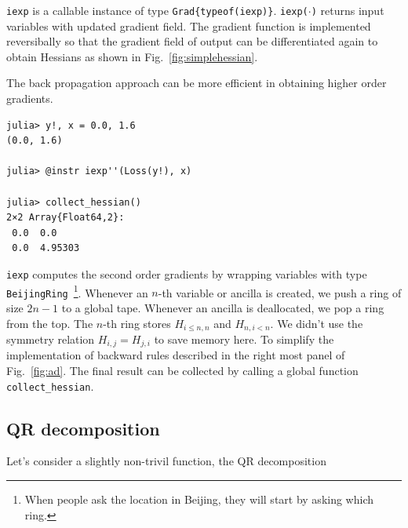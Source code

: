 \documentclass[aps,twocolumn,longbibliography,english,superscriptaddress,prr]{revtex4-1}
\newcommand{\<}{\langle}
\renewcommand{\>}{\rangle}
\newcommand{\Fig}[1]{Fig.~\ref{#1}}
\theoremstyle{definition}\newtheorem{definition}{\textit{Definition}}
\begin{document}
\texttt{iexp\textquotesingle} is a callable instance of type \texttt{Grad\{typeof(iexp)\}}. \texttt{iexp\textquotesingle($\cdot$)} returns input variables with updated gradient field.
The gradient function is implemented reversibally so that the gradient field of output can be differentiated again to obtain Hessians as shown in \Fig{fig:simplehessian}.

The back propagation approach can be more efficient in obtaining higher order gradients.

\begin{minipage}{.44\textwidth}
\begin{lstlisting}
julia> y!, x = 0.0, 1.6
(0.0, 1.6)

julia> @instr iexp''(Loss(y!), x)

julia> collect_hessian()
2×2 Array{Float64,2}:
 0.0  0.0
 0.0  4.95303
\end{lstlisting}
\end{minipage}
\texttt{iexp\textquotesingle\textquotesingle} computes the second order gradients by wrapping variables with type \texttt{BeijingRing}~\footnote{When people ask the location in Beijing, they will start by asking which ring.}. Whenever an $n$-th variable or ancilla is created, we push a ring of size $2n-1$ to a global tape. Whenever an ancilla is deallocated, we pop a ring from the top. The $n$-th ring stores $H_{i\leq n,n}$ and $H_{n,i<n}$. We didn't use the symmetry relation $H_{i,j} = H_{j,i}$ to save memory here.
To simplify the implementation of backward rules described in the right most panel of \Fig{fig:ad}.
The final result can be collected by calling a global function \texttt{collect\_hessian}.

\subsection{QR decomposition}

Let's consider a slightly non-trivil function, the QR decomposition
\end{document}
